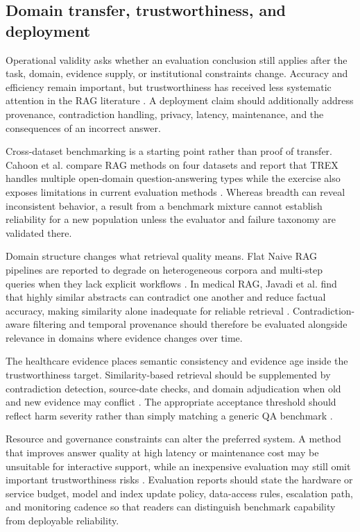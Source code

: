 \documentclass[a4paper,11pt]{article}
\begin{document}
\subsection{Domain transfer, trustworthiness, and deployment}


Operational validity asks whether an evaluation conclusion still applies after the task, domain, evidence supply, or institutional constraints change. Accuracy and efficiency remain important, but trustworthiness has received less systematic attention in the RAG literature \citep{Zhou2024Trustworthiness}. A deployment claim should additionally address provenance, contradiction handling, privacy, latency, maintenance, and the consequences of an incorrect answer.

Cross-dataset benchmarking is a starting point rather than proof of transfer. Cahoon et al. compare RAG methods on four datasets and report that TREX handles multiple open-domain question-answering types while the exercise also exposes limitations in current evaluation methods \citep{Cahoon2025Optimizing}. Whereas breadth can reveal inconsistent behavior, a result from a benchmark mixture cannot establish reliability for a new population unless the evaluator and failure taxonomy are validated there.

Domain structure changes what retrieval quality means. Flat Naive RAG pipelines are reported to degrade on heterogeneous corpora and multi-step queries when they lack explicit workflows \citep{Kovalskii2026Domain}. In medical RAG, Javadi et al. find that highly similar abstracts can contradict one another and reduce factual accuracy, making similarity alone inadequate for reliable retrieval \citep{Javadi2025Contradictions}. Contradiction-aware filtering and temporal provenance should therefore be evaluated alongside relevance in domains where evidence changes over time.

The healthcare evidence places semantic consistency and evidence age inside the trustworthiness target. Similarity-based retrieval should be supplemented by contradiction detection, source-date checks, and domain adjudication when old and new evidence may conflict \citep{Javadi2025Contradictions}. The appropriate acceptance threshold should reflect harm severity rather than simply matching a generic QA benchmark \citep{Zhou2024Trustworthiness}.

Resource and governance constraints can alter the preferred system. A method that improves answer quality at high latency or maintenance cost may be unsuitable for interactive support, while an inexpensive evaluation may still omit important trustworthiness risks \citep{Cahoon2025Optimizing,Zhou2024Trustworthiness}. Evaluation reports should state the hardware or service budget, model and index update policy, data-access rules, escalation path, and monitoring cadence so that readers can distinguish benchmark capability from deployable reliability.
\end{document}

